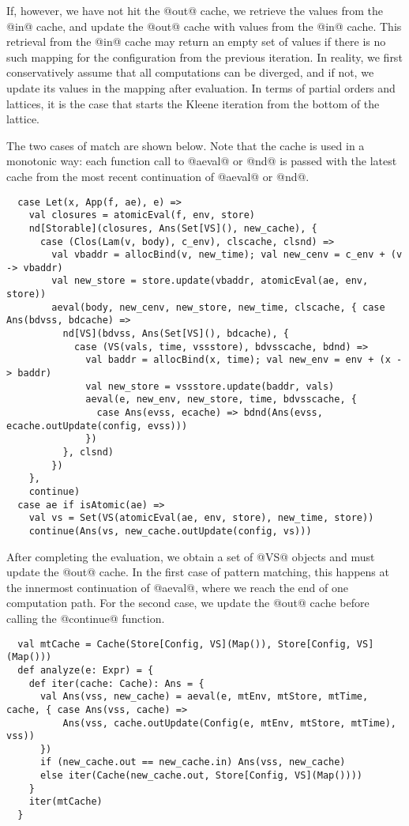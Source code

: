 \documentclass[acmsmall, review]{acmart}\settopmatter{}
\begin{document}
If, however, we have not hit the @out@ cache, we retrieve the values from the @in@ cache, 
and update the @out@ cache with values from the @in@ cache. This retrieval from the @in@ 
cache may return an empty set of values if there is no such mapping for the configuration 
from the previous iteration.
In reality, we first conservatively assume that all computations can be diverged, and if 
not, we update its values in the mapping after evaluation. In terms of partial orders and 
lattices, it is the case that starts the Kleene iteration from the bottom of the lattice.

The two cases of match are shown below. Note that the cache is used in a monotonic way: 
each function call to @aeval@ or @nd@ is passed with the latest cache from the most recent 
continuation of @aeval@ or @nd@.

\begin{lstlisting}
  case Let(x, App(f, ae), e) =>
    val closures = atomicEval(f, env, store)
    nd[Storable](closures, Ans(Set[VS](), new_cache), {
      case (Clos(Lam(v, body), c_env), clscache, clsnd) =>
        val vbaddr = allocBind(v, new_time); val new_cenv = c_env + (v -> vbaddr)
        val new_store = store.update(vbaddr, atomicEval(ae, env, store))
        aeval(body, new_cenv, new_store, new_time, clscache, { case Ans(bdvss, bdcache) =>
          nd[VS](bdvss, Ans(Set[VS](), bdcache), {
            case (VS(vals, time, vssstore), bdvsscache, bdnd) =>
              val baddr = allocBind(x, time); val new_env = env + (x -> baddr)
              val new_store = vssstore.update(baddr, vals)
              aeval(e, new_env, new_store, time, bdvsscache, {
                case Ans(evss, ecache) => bdnd(Ans(evss, ecache.outUpdate(config, evss)))
              })
          }, clsnd)
        })
    },
    continue)
  case ae if isAtomic(ae) =>
    val vs = Set(VS(atomicEval(ae, env, store), new_time, store))
    continue(Ans(vs, new_cache.outUpdate(config, vs)))
\end{lstlisting}

After completing the evaluation, we obtain a set of @VS@ objects and must update the @out@ cache.
In the first case of pattern matching, this happens at the innermost continuation of @aeval@,
where we reach the end of one computation path.
For the second case, we update the @out@ cache before calling the @continue@ function.

\begin{lstlisting}
  val mtCache = Cache(Store[Config, VS](Map()), Store[Config, VS](Map()))
  def analyze(e: Expr) = {
    def iter(cache: Cache): Ans = {
      val Ans(vss, new_cache) = aeval(e, mtEnv, mtStore, mtTime, cache, { case Ans(vss, cache) => 
          Ans(vss, cache.outUpdate(Config(e, mtEnv, mtStore, mtTime), vss))
      })
      if (new_cache.out == new_cache.in) Ans(vss, new_cache)
      else iter(Cache(new_cache.out, Store[Config, VS](Map())))
    }
    iter(mtCache)
  }
\end{lstlisting}
\end{document}
